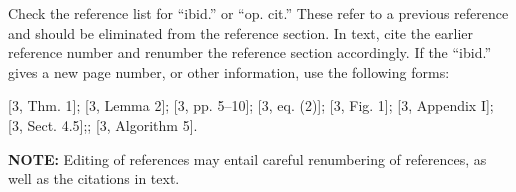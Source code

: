 \documentclass[10pt]{article}
\renewcommand{\thesubsection}{\Alph{subsection}}
\newcommand*{\subsectionlabel}{\thesubsection.}
\newcommand*{\guideindent}{\hspace*{14pt}}
\begin{document}
\guideindent Check the reference list for “ibid.” or “op. cit.” These refer to a previous reference and should be eliminated from the reference section. In text, cite the earlier reference number and renumber the reference section accordingly. If the “ibid.” gives a new page number, or other information, use the following forms:

{\leftskip=36pt [3, Thm. 1]; [3, Lemma 2]; [3, pp. 5–10]; [3, eq. (2)]; [3, Fig. 1]; [3, Appendix I]; [3, Sect. 4.5];\newline
[3, Ch. 2, pp. 5–10]; [3, Algorithm 5].\par}

\textbf{NOTE:} Editing of references may entail careful renumbering of references, as well as the citations in text.

\renewcommand*{\subsectionlabel}{\thesubsection.}
\end{document}
